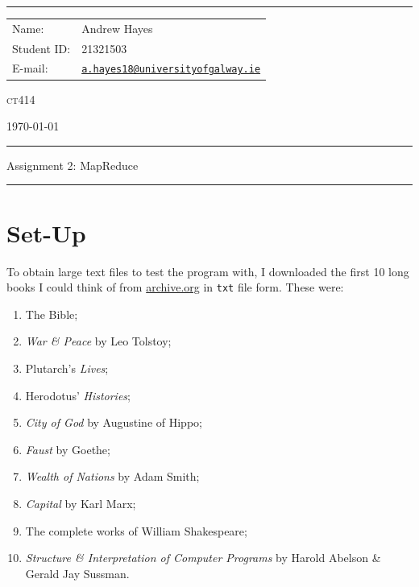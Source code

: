\documentclass[a4paper]{article}
\begin{document}
\hrule \medskip
\begin{minipage}{0.295\textwidth} 
    \raggedright
    \footnotesize 
    \begin{tabular}{@{}l l}
        Name: & Andrew Hayes \\
        Student ID: & 21321503 \\
        E-mail: & \href{mailto://a.hayes18@universityofgalway.ie}{\texttt{a.hayes18@universityofgalway.ie}} \\
    \end{tabular}
\end{minipage}
\begin{minipage}{0.4\textwidth} 
    \centering 
    \vspace{0.4em}
    \LARGE
    \textsc{ct414} \\ 
\end{minipage}
\begin{minipage}{0.295\textwidth} 
    \raggedleft
    \today
\end{minipage}
\medskip\hrule 
\begin{center}
    \normalsize
    Assignment 2: MapReduce
\end{center}
\hrule
\medskip

\section{Set-Up}
To obtain large text files to test the program with, I downloaded the first 10 long books I could think of from \url{archive.org} in \verb|txt| file form.
These were:
\begin{enumerate}
    \item   The Bible;
    \item   \textit{War \& Peace} by Leo Tolstoy;
    \item   Plutarch's \textit{Lives};
    \item   Herodotus' \textit{Histories};
    \item   \textit{City of God} by Augustine of Hippo;
    \item   \textit{Faust} by Goethe;
    \item   \textit{Wealth of Nations} by Adam Smith;
    \item   \textit{Capital} by Karl Marx;
    \item   The complete works of William Shakespeare;
    \item   \textit{Structure \& Interpretation of Computer Programs} by Harold Abelson \& Gerald Jay Sussman.
\end{enumerate}
\end{document}
